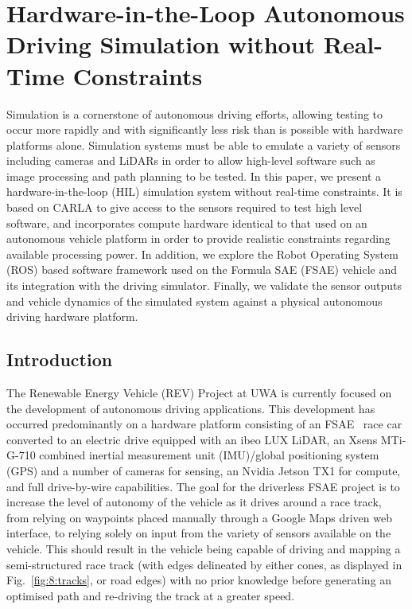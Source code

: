 
\chapter[Hardware-in-the-Loop Autonomous Driving Simulation]{Hardware-in-the-Loop Autonomous Driving Simulation without Real-Time Constraints}
\label{ch:sim}

\ifpdf
	\graphicspath{{Chapter8/Figs/Raster/}{Chapter8/Figs/PDF/}{Chapter8/Figs/}}
\else
	\graphicspath{{Chapter8/Figs/Vector/}{Chapter8/Figs/}}
\fi

Simulation is a cornerstone of autonomous driving efforts, allowing testing to occur more rapidly and with significantly less risk than is possible with hardware platforms alone.
Simulation systems must be able to emulate a variety of sensors including cameras and LiDARs in order to allow high-level software such as image processing and path planning to be tested.
In this paper, we present a hardware-in-the-loop (HIL) simulation system without real-time constraints.
It is based on CARLA to give access to the sensors required to test high level software, and incorporates compute hardware identical to that used on an autonomous vehicle platform in order to provide realistic constraints regarding available processing power.
In addition, we explore the Robot Operating System (ROS) based software framework used on the Formula SAE (FSAE) vehicle and its integration with the driving simulator.
Finally, we validate the sensor outputs and vehicle dynamics of the simulated system against a physical autonomous driving hardware platform.

\section{Introduction} \label{introduction}

The Renewable Energy Vehicle (REV) Project at UWA is currently focused on the development of autonomous driving applications.
This development has occurred predominantly on a hardware platform consisting of an FSAE~\cite{sae_international_student_nodate} race car converted to an electric drive equipped with an ibeo LUX LiDAR, an Xsens MTi-G-710 combined inertial measurement unit (IMU)/global positioning system (GPS) and a number of cameras for sensing, an Nvidia Jetson TX1 for compute, and full drive-by-wire capabilities.
The goal for the driverless FSAE project is to increase the level of autonomy of the vehicle as it drives around a race track, from relying on waypoints placed manually through a Google Maps driven web interface, to relying solely on input from the variety of sensors available on the vehicle.
This should result in the vehicle being capable of driving and mapping a semi-structured race track (with edges delineated by either cones, as displayed in Fig.~\ref{fig:8:tracks}, or road edges) with no prior knowledge before generating an optimised path and re-driving the track at a greater speed.

